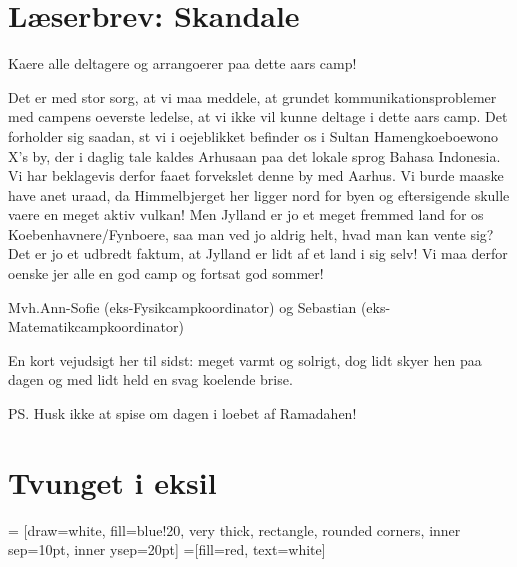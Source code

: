 

\begin{minipage}[b]{0.95\linewidth}
\begin{minipage}[t]{0.47\textwidth}
\vspace{3mm}
\section*{Læserbrev: Skandale}
Kaere alle deltagere og arrangoerer paa dette aars camp!

Det er med stor sorg, at vi maa meddele, at grundet kommunikationsproblemer med campens oeverste ledelse, at vi ikke vil kunne deltage i dette aars camp. 
Det forholder sig saadan, st vi i oejeblikket befinder os i Sultan Hamengkoeboewono X's by, der i daglig tale kaldes Arhusaan paa det lokale sprog Bahasa Indonesia. 
Vi har beklagevis derfor faaet forvekslet denne by med Aarhus. Vi burde maaske have anet uraad, da Himmelbjerget her ligger nord for byen og eftersigende skulle vaere en meget aktiv vulkan! Men Jylland er jo et meget fremmed land for os Koebenhavnere/Fynboere, saa man ved jo aldrig helt, hvad man kan vente sig? Det er jo et udbredt faktum, at Jylland er lidt af et land i sig selv!
Vi maa derfor oenske jer alle en god camp og fortsat god sommer!

Mvh.Ann-Sofie (eks-Fysikcampkoordinator) og Sebastian (eks-Matematikcampkoordinator)

En kort vejudsigt her til sidst: meget varmt og solrigt, dog lidt skyer hen paa dagen og med lidt held en svag koelende brise.

PS. Husk ikke at spise om dagen i loebet af Ramadahen!

\section*{Tvunget i eksil}



\end{minipage}
\hfill\begin{minipage}[t]{0.47\textwidth}

\vspace{1mm}
 = [draw=white, fill=blue!20, very thick,
    rectangle, rounded corners, inner sep=10pt, inner ysep=20pt]
 =[fill=red, text=white]


\end{minipage}
\end{minipage}
